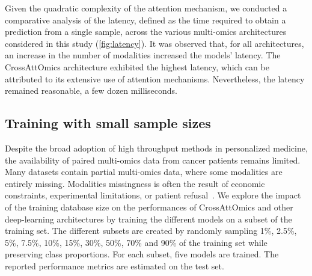 \documentclass[../main.tex]{subfiles}
\begin{document}
		Given the quadratic complexity of the attention mechanism, we conducted a comparative analysis of the latency, defined as the time required to obtain a prediction from a single sample, across the various multi-omics architectures considered in this study (\cref{fig:latency}).
		It was observed that, for all architectures, an increase in the number of modalities increased the models' latency.
		The CrossAttOmics architecture exhibited the highest latency, which can be attributed to its extensive use of attention mechanisms. Nevertheless, the latency remained reasonable,  a few dozen milliseconds.

	\subsection{Training with small sample sizes}
		Despite the broad adoption of high throughput methods in personalized medicine, the availability of paired multi-omics data from cancer patients remains limited.
		Many datasets contain partial multi-omics data, where some modalities are entirely missing.
		Modalities missingness is often the result of economic constraints, experimental limitations, or patient refusal~\cite{Kang2021}.
		We explore the impact of the training database size on the performances of CrossAttOmics and other deep-learning architectures by training the different models on a subset of the training set.
		The different subsets are created by randomly sampling 1\%, 2.5\%, 5\%, 7.5\%, 10\%, 15\%, 30\%, 50\%, 70\% and 90\% of the training set while preserving class proportions.
		For each subset, five models are trained.
		The reported performance metrics are estimated on the test set.
\end{document}
